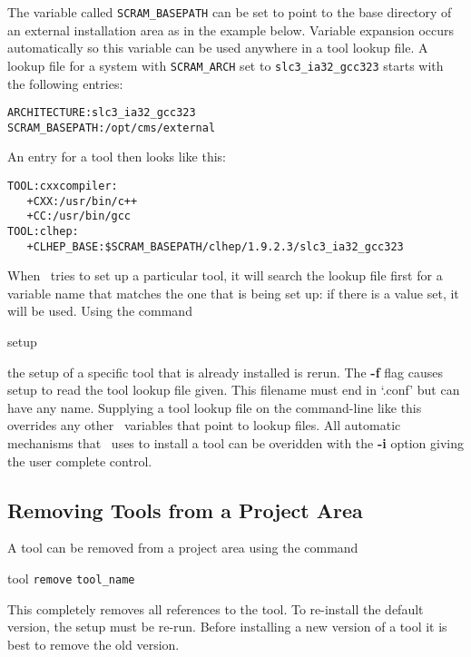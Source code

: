 The variable called \texttt{SCRAM\_BASEPATH} can be set to
point to the base directory of an external installation area as in the example
below. Variable expansion occurs automatically so this variable can be
used anywhere in a tool lookup file.
A lookup file for a system with \texttt{SCRAM\_ARCH} set to
\texttt{slc3\_ia32\_gcc323} starts with the following entries:

\small{
\begin{verbatim}
ARCHITECTURE:slc3_ia32_gcc323
SCRAM_BASEPATH:/opt/cms/external
\end{verbatim}
}\normalsize

An entry for a tool then looks like this:

\small{
\begin{verbatim}
TOOL:cxxcompiler:
   +CXX:/usr/bin/c++
   +CC:/usr/bin/gcc
TOOL:clhep:
   +CLHEP_BASE:$SCRAM_BASEPATH/clhep/1.9.2.3/slc3_ia32_gcc323
\end{verbatim}
}\normalsize

\ni When \scram\ tries to set up a particular tool, it will search the
lookup file first for a variable name that matches the one that is
being set up: if there is a value set, it will be used.  Using the
command

\begin{scramcmd}{setup}
  ~~
\end{scramcmd}

\ni the setup of a specific tool that is already installed is rerun.
The \textbf{-f} flag causes setup to read the tool lookup file given.
This filename must end in `.conf' but can have any name. Supplying a
tool lookup file on the command-line like this overrides any other
\scram\ variables that point to lookup files.  All automatic mechanisms
that \scram\ uses to install a tool can be overidden with the
\textbf{-i} option giving the user complete control.

\subsection{Removing Tools from a Project Area}\label{sec:removingtools}
A tool can be removed from a project area using the command

\begin{scramcmd}{tool}
  \texttt{remove} \texttt{tool\_name}
\end{scramcmd}

\ni This completely removes all references to the tool. To re-install
the default version, the setup must be re-run. Before installing a new
version of a tool it is best to remove the old version.


